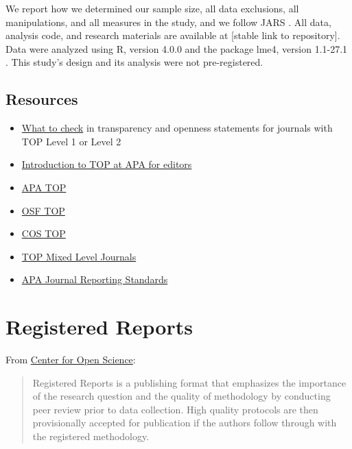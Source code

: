 \documentclass[
  oneside]{book}
\providecommand{\tightlist}{%
  \setlength{\itemsep}{0pt}\setlength{\parskip}{0pt}}
\begin{document}
We report how we determined our sample size, all data exclusions, all manipulations, and all measures in the study, and we follow JARS \citep{kazak2018journal}. All data, analysis code, and research materials are available at {[}stable link to repository{]}. Data were analyzed using R, version 4.0.0 \citep{R} and the package lme4, version 1.1-27.1 \citep{lme4}. This study's design and its analysis were not pre-registered.

\hypertarget{resources}{%
\section{Resources}\label{resources}}

\begin{itemize}
\tightlist
\item
  \href{https://www.dropbox.com/s/8jv2n0j3mlkhkrj/TOP_GuidanceforReviewers.docx}{What to check} in transparency and openness statements for journals with TOP Level 1 or Level 2
\item
  \href{https://www.dropbox.com/s/rx616egpte53o9m/TOP_at_APA_withScript.pdf}{Introduction to TOP at APA for editors}
\item
  \href{https://www.apa.org/pubs/journals/resources/transparency-openness-promotion}{APA TOP}
\item
  \href{https://osf.io/9f6gx/}{OSF TOP}
\item
  \href{https://www.cos.io/initiatives/top-guidelines}{COS TOP}
\item
  \href{https://docs.google.com/document/d/10cMB2IT406gPAgCAORa5_UVI6Plrwvl4XjTsd0Ya_4s/edit}{TOP Mixed Level Journals}
\item
  \href{https://apastyle.apa.org/jars}{APA Journal Reporting Standards}
\end{itemize}

\hypertarget{editors-registered-reports}{%
\chapter{Registered Reports}\label{editors-registered-reports}}

From \href{https://www.cos.io/initiatives/registered-reports}{Center for Open Science}:

\begin{quote}
Registered Reports is a publishing format that emphasizes the importance of the research question and the quality of methodology by conducting peer review prior to data collection. High quality protocols are then provisionally accepted for publication if the authors follow through with the registered methodology.
\end{quote}
\end{document}
